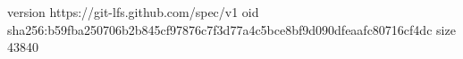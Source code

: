 version https://git-lfs.github.com/spec/v1
oid sha256:b59fba250706b2b845cf97876c7f3d77a4c5bce8bf9d090dfeaafc80716cf4dc
size 43840
